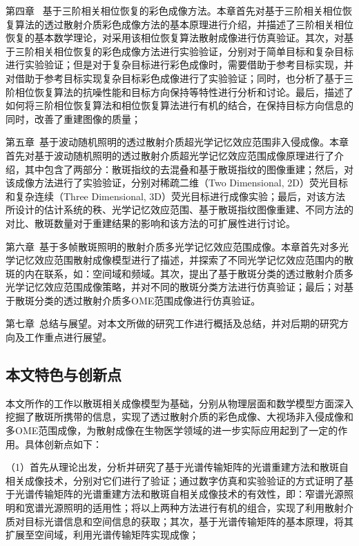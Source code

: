 第四章 \ 基于三阶相关相位恢复的彩色成像方法。本章首先对基于三阶相关相位恢复算法的透过散射介质彩色成像方法的基本原理进行介绍，并描述了三阶相关相位恢复的基本数学理论，对采用该相位恢复算法散射成像进行仿真验证。其次，对基于三阶相关相位恢复的彩色成像方法进行实验验证，分别对于简单目标和复杂目标进行实验验证；但是对于复杂目标进行彩色成像时，需要借助于参考目标实现，并对借助于参考目标实现复杂目标彩色成像进行了实验验证；同时，也分析了基于三阶相位恢复算法的抗噪性能和目标方向保持等特性进行分析和讨论。最后，描述了如何将三阶相位恢复算法和相位恢复算法进行有机的结合，在保持目标方向信息的同时，改善了重建图像的质量；

第五章\  基于波动随机照明的透过散射介质超光学记忆效应范围非入侵成像。本章首先对基于波动随机照明的透过散射介质超光学记忆效应范围成像原理进行了介绍，其中包含了两部分：散斑指纹的去混叠和基于散斑指纹的图像重建；然后，对该成像方法进行了实验验证，分别对稀疏二维（Two Dimensional, 2D）荧光目标和复杂连续（Three Dimensional, 3D）荧光目标进行成像实验；最后，对该方法所设计的估计系统的秩、光学记忆效应范围、基于散斑指纹图像重建、不同方法的对比、散斑数量对于重建结果的影响和该方法的可扩展性进行讨论。

第六章\ 基于多帧散斑照明的散射介质多光学记忆效应范围成像。本章首先对多光学记忆效应范围散射成像模型进行了描述，并探索了不同光学记忆效应范围内的散斑的内在联系，如：空间域和频域。其次，提出了基于散斑分类的透过散射介质多光学记忆效应范围成像策略，并对不同的散斑分类方法进行仿真验证；最后；对基于散斑分类的透过散射介质多OME范围成像进行仿真验证。

第七章\ 总结与展望。对本文所做的研究工作进行概括及总结，并对后期的研究方向及工作重点进行展望。

\subsection{本文特色与创新点}

本文所作的工作以散斑相关成像模型为基础，分别从物理层面和数学模型方面深入挖掘了散斑所携带的信息，实现了透过散射介质的彩色成像、大视场非入侵成像和多OME范围成像，为散射成像在生物医学领域的进一步实际应用起到了一定的作用。具体创新点如下：

（1）首先从理论出发，分析并研究了基于光谱传输矩阵的光谱重建方法和散斑自相关成像技术，分别对它们进行了验证；通过数字仿真和实验验证的方式证明了基于光谱传输矩阵的光谱重建方法和散斑自相关成像技术的有效性，即：窄谱光源照明和宽谱光源照明的适用性；将以上两种方法进行有机的组合，实现了利用散射介质对目标光谱信息和空间信息的获取；其次，基于光谱传输矩阵的基本原理，将其扩展至空间域，利用光谱传输矩阵实现成像；

